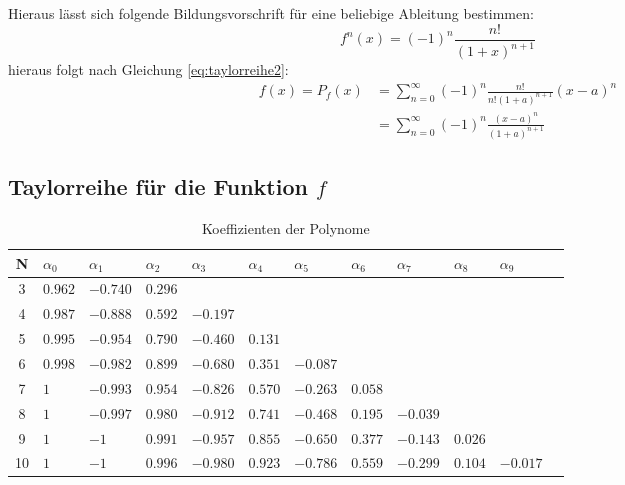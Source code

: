 \documentclass{beamer}
\begin{document}
  \begin{frame}
    Hieraus lässt sich folgende Bildungsvorschrift für eine beliebige Ableitung bestimmen:
    \begin{equation}
        f^n\left(x\right) = \left(-1\right)^n \frac{n!}{\left(1+x\right)^{n+1}}
    \end{equation}
    hieraus folgt nach Gleichung \ref{eq:taylorreihe2}:
    \begin{align}
        f\left(x\right)  =  P_f\left(x\right) 
                        &= \sum_{n=0}^{\infty} \left(-1\right)^n
                            \frac{n!}{n!\left(1+a\right)^{n+1}}\left(x-a\right)^n\\
                        &=  \sum_{n=0}^{\infty} \left(-1\right)^n
                            \frac{\left(x-a\right)^n}{\left(1+a\right)^{n+1}}
    \end{align}
  \end{frame}
    
  \subsection{Taylorreihe für die Funktion $f$}
  \begin{frame}
    \centering    
    \begin{table}[htbp]
    \tiny   
    \renewcommand{\arraystretch}{1.5}
    \begin{tabularx}{\textwidth}{|c|X|X|X|X|X|X|X|X|X|X|X|}
        \hline    
        N & $\alpha_0$&$\alpha_1$&$\alpha_2$&$\alpha_3$&$\alpha_4$&$\alpha_5$&$\alpha_6$&$\alpha_7$&$\alpha_8$&$\alpha_9$\\\hline
        3 & $0.962$ & $-0.740$ & $0.296$ &&&&&&& \\\hline
        4 & $0.987$ & $-0.888$ & $0.592$ & $-0.197$ &&&&&& \\\hline
        5 & $0.995$ & $-0.954$ & $0.790$ & $-0.460$ & $0.131$ &&&&& \\\hline
        6 & $0.998$ & $-0.982$ & $0.899$ & $-0.680$ & $0.351$ & $-0.087$ &&&& \\\hline
        7 & $1$ & $-0.993$ & $0.954$ & $-0.826$ & $0.570$ & $-0.263$ & $0.058$ &&& \\\hline
        8 & $1$ & $-0.997$ & $0.980$ & $-0.912$ & $0.741$ & $-0.468$ & $0.195$ & $-0.039$ && \\\hline
        9 & $1$ & $-1$ & $0.991$ & $-0.957$ & $0.855$ & $-0.650$ & $0.377$ & $-0.143$ & $0.026$ & \\\hline
        10& $1$ & $-1$ & $0.996$ & $-0.980$ & $0.923$ & $-0.786$ & $0.559$ & $-0.299$ & $0.104$ & $-0.017$ \\\hline
    \end{tabularx}
    \caption{Koeffizienten der Polynome}      
    \end{table}
  \end{frame}
  
\end{document}
